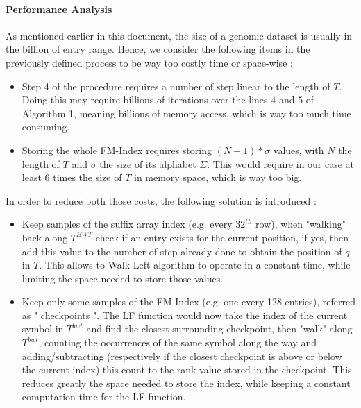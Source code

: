 \paragraph{Performance Analysis}

As mentioned earlier in this document, the size of a genomic dataset is usually in the billion of entry range. Hence, we consider the following items in the previously defined process to be way too costly time or space-wise : 
\begin{itemize}
	\item Step 4 of the procedure requires a number of step linear to the length of $T$. Doing this may require billions of iterations over the lines $4$ and $5$ of Algorithm 1, meaning billions of memory access, which is way too much time consuming.
	\item Storing the whole FM-Index requires storing $(N + 1)*\sigma$ values, with $N$ the length of $T$ and $\sigma$ the size of its alphabet $\Sigma$. This would require in our case at least 6 times the size of $T$ in memory space, which is way too big.
	\end{itemize}
	In order to reduce both those costs, the following solution is introduced :
	\begin{itemize}
		\item Keep samples of the suffix array index (e.g. every 32$^{th}$ row), when "walking" back along $T^{BWT}$ check if an entry exists for the current position, if yes, then add this value to the number of step already done to obtain the position of $q$ in $T$. This allows to Walk-Left algorithm to operate in a constant time, while limiting the space needed to store those values.
		\item Keep only some samples of the FM-Index (e.g. one every 128 entries), referred as " checkpoints ". The LF function would now take the index of the current symbol in $T^{bwt}$ and find the closest surrounding checkpoint, then "walk" along $T^{bwt}$, counting the occurrences of the same symbol along the way and adding/subtracting (respectively if the closest checkpoint is above or below the current index) this count to the rank value stored in the checkpoint. This reduces greatly the space needed to store the index, while keeping a constant computation time for the LF function.
		\end{itemize}
		
